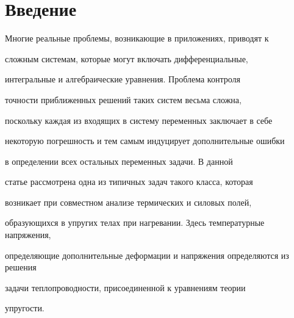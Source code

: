 \date{}




\pagestyle{plain} %







\maketitle


\label{begin}














\section{Введение}





Многие реальные проблемы, возникающие в приложениях, приводят к


сложным системам, которые могут включать дифференциальные,


интегральные и алгебраические уравнения. Проблема контроля


точности приближенных решений таких систем весьма сложна,


поскольку каждая из входящих в систему переменных заключает в себе


некоторую погрешность и тем самым индуцирует дополнительные ошибки


в определении всех остальных переменных задачи. В данной


статье рассмотрена одна из типичных задач такого класса, которая


возникает при совместном анализе термических и силовых полей,


образующихся в упругих телах при нагревании. Здесь температурные напряжения,


определяющие дополнительные деформации и напряжения определяются из решения


задачи теплопроводности, присоединенной к уравнениям теории


упругости.





